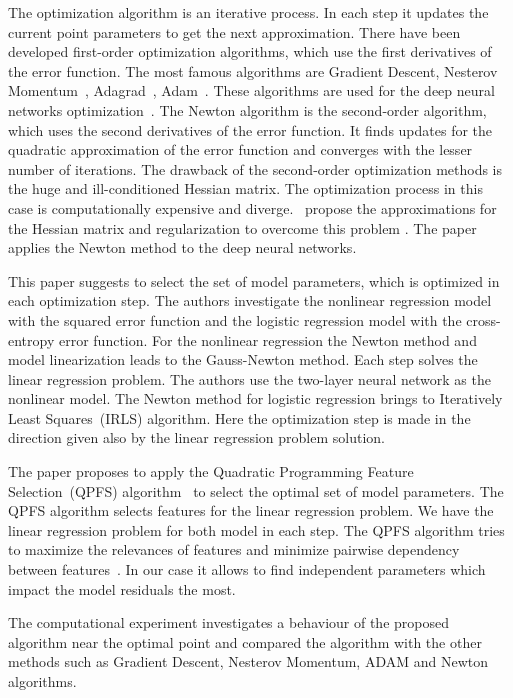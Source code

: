 \documentclass[a4paper,12pt]{article}
\theoremstyle{plain} %
\theoremstyle{definition} %
\theoremstyle{remark} %
\begin{document}
	The optimization algorithm is an iterative process. 
	In each step it updates the current point parameters to get the next approximation.
	There have been developed first-order optimization algorithms, which use the first derivatives of the error function. 
	The most famous algorithms are Gradient Descent, Nesterov Momentum~\cite{nesterov1983momentum}, Adagrad~\cite{duchi2011adagrad}, Adam~\cite{kingma2014adam}. 
	These algorithms are used for the deep neural networks optimization~\cite{goodfellow2016deeplearningbook}. 
	The Newton algorithm is the second-order algorithm, which uses the second derivatives of the error function. 
	It finds updates for the quadratic approximation of the error function and converges with the lesser number of iterations.
	The drawback of the second-order optimization methods is the huge and ill-conditioned Hessian matrix. 
	The optimization process in this case is computationally expensive and diverge. 
	\cite{avriel2003nonlinear,blaschke1997convergence}~propose the approximations for the Hessian matrix and regularization to overcome this problem .
	The paper~\cite{botev2017newtondeeplearning} applies the Newton method to the deep neural networks.
	
	This paper suggests to select the set of model parameters, which is optimized in each optimization step.
	The authors investigate the nonlinear regression model with the squared error function and the logistic regression model with the cross-entropy error function.
	For the nonlinear regression the Newton method and model linearization leads to the Gauss-Newton method. 
	Each step solves the linear regression problem. 
	The authors use the two-layer neural network as the nonlinear model. 
	The Newton method for logistic regression brings to Iteratively Least Squares~(IRLS) algorithm. 
	Here the optimization step is made in the direction given also by the linear regression problem solution.
	
	The paper proposes to apply the Quadratic Programming Feature Selection~(QPFS) algorithm~\cite{katrutsa2017comprehensive,rodriguez2010qpfs} to select the optimal set of model parameters. The QPFS algorithm selects features for the linear regression problem. We have the linear regression problem for both model in each step. The QPFS algorithm tries to maximize the relevances of features and minimize pairwise dependency between features~\cite{ding2005mrmr}. In our case it allows to find independent parameters which impact the model residuals the most.
	
	The computational experiment investigates a behaviour of the proposed algorithm near the optimal point and compared the algorithm with the other methods such as Gradient Descent, Nesterov Momentum, ADAM and Newton algorithms. 
	
\end{document}
